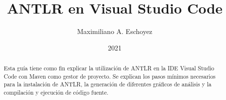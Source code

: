 \documentclass[a5paper,10pt]{article}
\author{Maximiliano A. Eschoyez}
\title{ANTLR en Visual Studio Code}
\date{2021}
\begin{document}
\maketitle



\begin{abstract}
	Esta guía tiene como fin explicar la utilización de ANTLR en la IDE Visual Studio Code con Maven como gestor de proyecto.  Se explican los pasos mínimos necesarios para la instalación de ANTLR, la generación de diferentes gráficos de análisis y la compilación y ejecución de código fuente.
\end{abstract}



\clearpage




\end{document}

